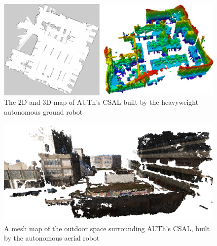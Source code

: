 \vfill

\begin{figure}[H]\centering
  \includegraphics[scale=0.4]{images/relief/csal_maps.png}
  \caption{\small The 2D and 3D map of AUTh's CSAL built by the heavyweight
           autonomous ground robot}
  \label{fig:csal_maps}
\end{figure}

\vfill

\begin{figure}[H]\centering
  \includegraphics[scale=0.3]{images/relief/e_map.png}
  \caption{\small A mesh map of the outdoor space surrounding AUTh's CSAL,
           built by the autonomous aerial robot}
  \label{fig:e_map}
\end{figure}


